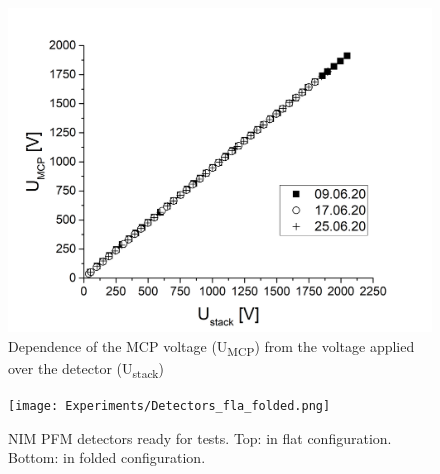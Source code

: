 	\begin{figure}[h]
		\centering
		\includegraphics[width=.7\textwidth]{Experiments/PFM_UstackUmccp_TimeEvol.png}
		\caption{Dependence of the MCP voltage (U\textsubscript{MCP}) from the voltage applied over the detector (U\textsubscript{stack})} %
		\label{fig:PFMUstackUmcpTimeEvol}
	\end{figure}
	\begin{figure}[h] %
		\centering
		\texttt{[image: Experiments/Detectors\_fla\_folded.png]}
		\caption{NIM PFM detectors ready for tests. Top: in flat configuration. Bottom: in folded configuration.}
		\label{fig:DetFlatFolded}
	\end{figure}
